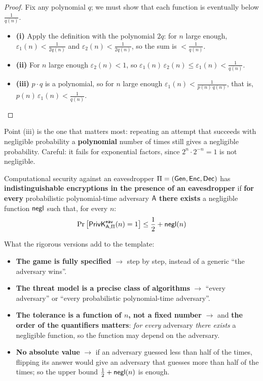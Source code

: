 \begin{proof}
  Fix any polynomial $q$; we must show that each function is eventually below $\frac{1}{q(n)}$.
  \begin{itemize}
    \item \textbf{(i)} Apply the definition with the polynomial $2q$: for $n$ large enough, $\varepsilon_1(n) < \frac{1}{2q(n)}$ and $\varepsilon_2(n) < \frac{1}{2q(n)}$, so the sum is $< \frac{1}{q(n)}$.
    \item \textbf{(ii)} For $n$ large enough $\varepsilon_2(n) < 1$, so $\varepsilon_1(n)\,\varepsilon_2(n) \leq \varepsilon_1(n) < \frac{1}{q(n)}$.
    \item \textbf{(iii)} $p \cdot q$ is a polynomial, so for $n$ large enough $\varepsilon_1(n) < \frac{1}{p(n)\,q(n)}$, that is, $p(n)\,\varepsilon_1(n) < \frac{1}{q(n)}$. \qedhere
  \end{itemize}
\end{proof}

Point (iii) is the one that matters most: repeating an attempt that succeeds with negligible probability a \textbf{polynomial} number of times still gives a negligible probability. Careful: it fails for exponential factors, since $2^n \cdot 2^{-n} = 1$ is not negligible.

\begin{frameddefn}[label={def:eav}]{Computational security against an eavesdropper}
  $\Pi = (\mathsf{Gen}, \mathsf{Enc}, \mathsf{Dec})$ has \textbf{indistinguishable encryptions in the presence of an eavesdropper} if \textbf{for every} probabilistic polynomial-time adversary $\mathsf{A}$ \textbf{there exists} a negligible function $\mathsf{negl}$ such that, for every $n$:
  \[
    \Pr\big[\mathsf{PrivK}^{\mathsf{eav}}_{\mathsf{A},\Pi}(n) = 1\big] \leq \frac{1}{2} + \mathsf{negl}(n)
  \]
\end{frameddefn}

What the rigorous versions add to the template:
\begin{itemize}
  \item \textbf{The game is fully specified} $\to$ step by step, instead of a generic ``the adversary wins''.
  \item \textbf{The threat model is a precise class of algorithms} $\to$ ``every adversary'' or ``every probabilistic polynomial-time adversary''.
  \item \textbf{The tolerance is a function of $n$, not a fixed number} $\to$ and \textbf{the order of the quantifiers matters}: \textit{for every} adversary \textit{there exists} a negligible function, so the function may depend on the adversary.
  \item \textbf{No absolute value} $\to$ if an adversary guessed less than half of the times, flipping its answer would give an adversary that guesses more than half of the times; so the upper bound $\frac{1}{2} + \mathsf{negl}(n)$ is enough.
\end{itemize}

